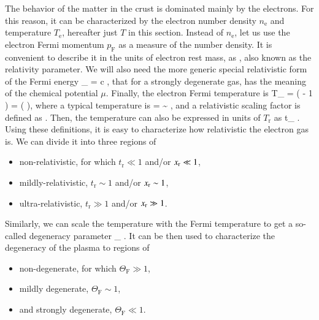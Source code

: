 The behavior of the matter in the crust is dominated mainly by the electrons. 
For this reason, it can be characterized by the electron number density $n_{\mathrm{e}}$ and temperature $T_{\mathrm{e}}$, hereafter just $T$ in this section.
Instead of $n_{\mathrm{e}}$, let us use the electron Fermi momentum $p_{\mathrm{F}}$  as a measure of the number density.
It is convenient to describe it in the units of electron rest mass, as
\be
\xr \equiv {},
\ee
also known as the relativity parameter.\cite{Salpeter61}
We will also need the more generic special relativistic form of the Fermi energy
\be
\epsilon_{} = c ,
\ee
that for a strongly degenerate gas, has the meaning of the chemical potential $\mu$.
Finally, the electron Fermi temperature is
\be
T_{} =  \left(  - 1 \right)
= \Tr (  ),
\ee
where a typical temperature is
\be
\Tr =  \sim {} \Kelvin,
\ee
and a relativistic scaling factor is defined as
\be
\gammar \equiv {}.
\ee
Then, the temperature can also be expressed in units of $T_{\mathrm{r}}$ as 
\be
t_{} \equiv {}.
\ee
Using these definitions, it is easy to characterize how relativistic the electron gas is.
We can divide it into three regions of 
\begin{itemize}
    \item non-relativistic, for which $t_{\mathrm{r}} \ll 1 $ and/or $x_{\mathrm{r}} \ll 1$, 
    \item mildly-relativistic, $t_{\mathrm{r}} \sim 1$ and/or $x_{\mathrm{r}} \sim 1$,
    \item ultra-relativistic, $t_{\mathrm{r}} \gg 1$ and/or $x_{\mathrm{r}} \gg 1$.
\end{itemize}

Similarly, we can scale the temperature with the Fermi temperature to get a so-called degeneracy parameter
\be\label{eq:Thetar}
\Theta_{} \equiv {}.
\ee
It can be then used to characterize the degeneracy of the plasma to regions of 
\begin{itemize}
    \item non-degenerate, for which $\Theta_{\mathrm{F}} \gg 1$,
    \item mildly degenerate, $\Theta_{\mathrm{F}} \sim 1$,
    \item and strongly degenerate, $\Theta_{\mathrm{F}} \ll 1$.
\end{itemize}


